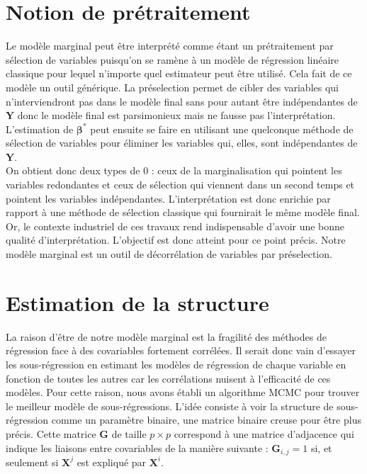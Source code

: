 \documentclass[12pt,a4paper]{report}
\begin{document}
	\section{Notion de prétraitement}
	Le modèle marginal peut être interprété comme étant un prétraitement par sélection de variables puisqu'on se ramène à un modèle de régression linéaire classique pour lequel n'importe quel estimateur peut être utilisé. Cela fait de ce modèle un outil générique. La préselection permet de cibler des variables qui n'interviendront pas dans le modèle final sans pour autant être indépendantes de $\boldsymbol{Y}$ donc le modèle final est parsimonieux mais ne fausse pas l'interprétation. L'estimation de $\boldsymbol{\beta}^*$ peut ensuite se faire en utilisant une quelconque méthode de sélection de variables pour éliminer les variables qui, elles, sont indépendantes de $\boldsymbol{Y}$.\\
	
	 On obtient donc deux types de 0 : ceux de la marginalisation qui pointent les variables redondantes et ceux de sélection qui viennent dans un second temps et pointent les variables indépendantes. L'interprétation est donc enrichie par rapport à une méthode de sélection classique qui fournirait le même modèle final. Or, le contexte industriel de ces travaux rend indispensable d'avoir une bonne qualité d'interprétation. L'objectif est donc atteint pour ce point précis. Notre modèle marginal est un outil de décorrélation de variables par préselection.
	 
	 \section{Estimation de la structure}
		La raison d'être de notre modèle marginal est la fragilité des méthodes de régression face à des covariables fortement corrélées. Il serait donc vain d'essayer les sous-régression en estimant les modèles de régression de chaque variable en fonction de toutes les autres car les corrélations nuisent à l'efficacité de ces modèles. Pour cette raison, nous avons établi un algorithme MCMC pour trouver le meilleur modèle de sous-régressions. L'idée consiste à voir la structure de sous-régression comme un paramètre binaire, une matrice binaire creuse pour être plus précis. Cette matrice $\boldsymbol{G}$ de taille $p\times p$ correspond à une matrice d'adjacence qui indique les liaisons entre covariables de la manière suivante : $\boldsymbol{G}_{i,j}=1$ si, et seulement si $\boldsymbol{X}^j$ est expliqué par $\boldsymbol{X}^i$. \\
		
\end{document}
